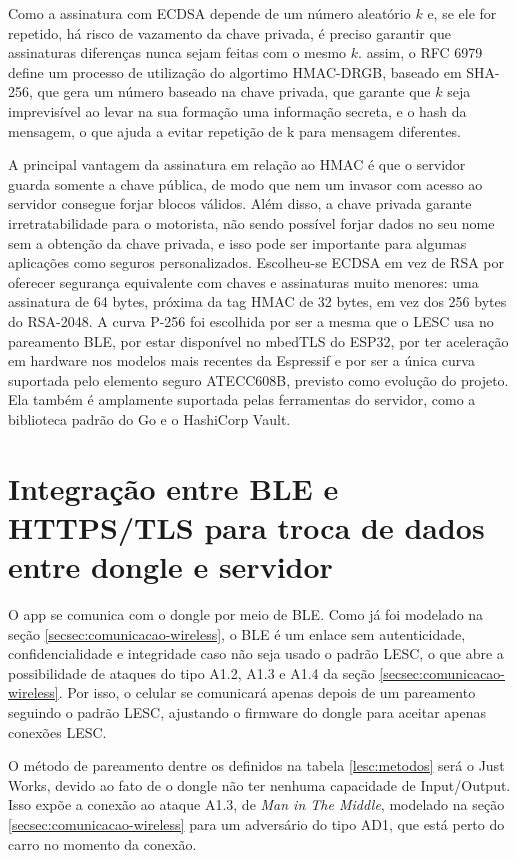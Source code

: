 \documentclass[
	12pt,
	article,			%
	oneside,
	a4paper,
	english,
	brazil				%
	]{abntex2}
\begin{document}
Como a assinatura com ECDSA depende de um número aleatório $k$ e, se ele for repetido, há risco de vazamento da chave privada, é
preciso garantir que assinaturas diferenças nunca sejam feitas com o mesmo $k$. assim, o RFC 6979 define um processo de utilização do
algortimo HMAC-DRGB, baseado em SHA-256, que gera um número baseado na chave privada, que garante que $k$ seja imprevisível ao levar
na sua formação uma informação secreta, e o hash da mensagem, o que ajuda a evitar repetição de k para mensagem diferentes.

A principal vantagem da assinatura em relação ao HMAC é que o servidor guarda somente a chave pública, de modo que nem um invasor
com acesso ao servidor consegue forjar blocos válidos. Além disso, a chave privada garante irretratabilidade para o motorista, não
sendo possível forjar dados no seu nome sem a obtenção da chave privada, e isso pode ser importante para algumas aplicações como seguros
personalizados. Escolheu-se ECDSA em vez de RSA por oferecer segurança equivalente com chaves e assinaturas muito menores: uma assinatura
de 64 bytes, próxima da tag HMAC de 32 bytes, em vez dos 256 bytes do RSA-2048. A curva P-256 foi escolhida por ser a mesma que o LESC 
usa no pareamento BLE, por estar disponível no mbedTLS do ESP32, por ter aceleração em hardware nos modelos mais recentes da Espressif e 
por ser a única curva suportada pelo elemento seguro ATECC608B, previsto como evolução do projeto. Ela também é amplamente suportada 
pelas ferramentas do servidor, como a biblioteca padrão do Go e o HashiCorp Vault.

\section{Integração entre BLE e HTTPS/TLS para troca de dados entre dongle e servidor}

O app se comunica com o dongle por meio de BLE. Como já foi modelado na seção \ref{secsec:comunicacao-wireless}, o BLE
é um enlace sem autenticidade, confidencialidade e integridade caso não seja usado o padrão LESC, o que abre
a possibilidade de ataques do tipo A1.2, A1.3 e A1.4 da seção \ref{secsec:comunicacao-wireless}. Por isso, o celular se comunicará
apenas depois de um pareamento seguindo o padrão LESC, ajustando o firmware do dongle para aceitar apenas conexões LESC.

O método de pareamento dentre os definidos na tabela \ref{lesc:metodos} será o Just Works, devido ao fato de o dongle não
ter nenhuma capacidade de Input/Output. Isso expõe a conexão ao ataque A1.3, de \textit{Man in The Middle}, modelado na seção
\ref{secsec:comunicacao-wireless} para um adversário do tipo AD1, que está perto do carro no momento da conexão. 
\end{document}
